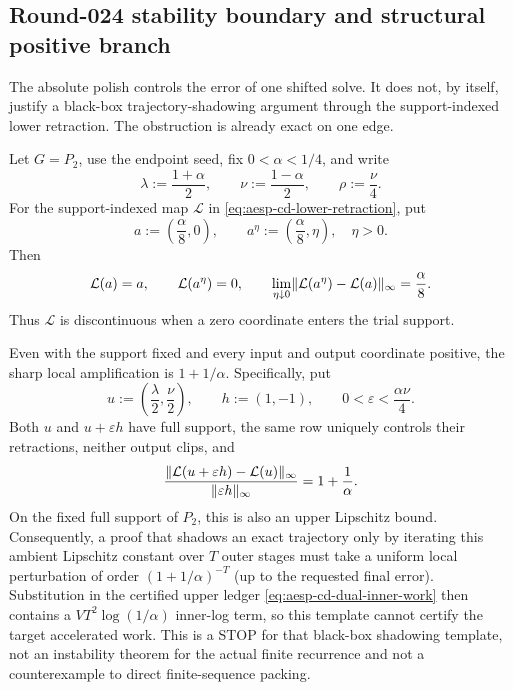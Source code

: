 \subsection{Round-024 stability boundary and structural positive branch}

The absolute polish controls the error of one shifted solve.  It does not,
by itself, justify a black-box trajectory-shadowing argument through the
support-indexed lower retraction.  The obstruction is already exact on one
edge.

\begin{proposition}
\label{prop:aesp-cd-retraction-shadowing-stop}
Let $G=P_2$, use the endpoint seed, fix $0<\alpha<1/4$, and write
\begin{equation*}
 \lambda:=\frac{1+\alpha}{2},
 \qquad \nu:=\frac{1-\alpha}{2},
 \qquad \rho:=\frac{\nu}{4}.
\end{equation*}
For the support-indexed map $\mathcal L$ in
\cref{eq:aesp-cd-lower-retraction}, put
\begin{equation*}
 a:=\left(\frac\alpha8,0\right),
 \qquad a^\eta:=\left(\frac\alpha8,\eta\right),\quad \eta>0.
\end{equation*}
Then
\begin{equation}
 \mathcal L(a)=a,
 \qquad
 \mathcal L(a^\eta)=0,
 \qquad
 \lim_{\eta\downarrow0}
 \lVert\mathcal L(a^\eta)-\mathcal L(a)\rVert_\infty
 =\frac\alpha8.
 \label{eq:aesp-cd-retraction-discontinuity}
\end{equation}
Thus $\mathcal L$ is discontinuous when a zero coordinate enters the trial
support.

Even with the support fixed and every input and output coordinate positive,
the sharp local amplification is $1+1/\alpha$.  Specifically, put
\begin{equation*}
 u:=\left(\frac\lambda2,\frac\nu2\right),
 \qquad h:=(1,-1),
 \qquad 0<\varepsilon<\frac{\alpha\nu}{4}.
\end{equation*}
Both $u$ and $u+\varepsilon h$ have full support, the same row uniquely
controls their retractions, neither output clips, and
\begin{equation}
 \frac{\lVert\mathcal L(u+\varepsilon h)-\mathcal L(u)\rVert_\infty}
      {\lVert\varepsilon h\rVert_\infty}
 =1+\frac1\alpha.
 \label{eq:aesp-cd-retraction-sharp-amplification}
\end{equation}
On the fixed full support of $P_2$, this is also an upper Lipschitz bound.
Consequently, a proof that shadows an exact trajectory only by iterating this
ambient Lipschitz constant over $T$ outer stages must take a uniform local
perturbation of order
$(1+1/\alpha)^{-T}$ (up to the requested final error).  Substitution in the
certified upper ledger \cref{eq:aesp-cd-dual-inner-work} then contains a
$VT^2\log(1/\alpha)$ inner-log term, so this template cannot certify the
target accelerated work.  This is a STOP for that
black-box shadowing template, not an instability theorem for the actual
finite recurrence and not a counterexample to direct finite-sequence
packing.
\end{proposition}

